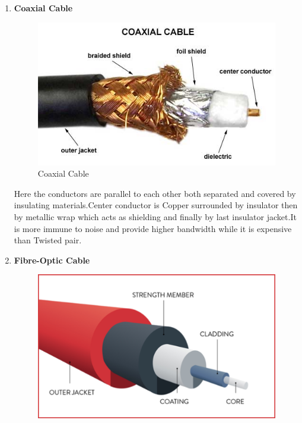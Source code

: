 \documentclass[a4paper,12pt]{article}
\begin{document}
\begin{A}
{\begin{enumerate}
\begin{enumerate}
		\item \textbf{Shielded Twisted Pair Cable (STP):}\\STP has jacket of aluminum or similar metal to block the external interference.It is faster ,safer but is heavy and expensive due to additional coating.
	\end{enumerate}
\item \textbf{ Coaxial Cable}\\
\begin{figure}[h]
\centering
\includegraphics[scale=0.7,cframe=blue 0.5pt 3pt]{coaxcable.jpg} 
\caption{Coaxial Cable}
\end{figure}
Here the conductors are parallel to each other both separated and covered by insulating materials.Center conductor is Copper  surrounded by insulator then by  metallic wrap which acts as shielding  and finally by last insulator jacket.It is more immune to noise and provide higher bandwidth while it is expensive than Twisted pair.
\item \textbf{Fibre-Optic Cable}\\
\begin{figure}[h]
\centering
\includegraphics[scale=0.7,cframe=blue 0.5pt 3pt]{Opticalfiber.png} 

\end{figure}
\end{enumerate}}
\end{A}
\end{document}
